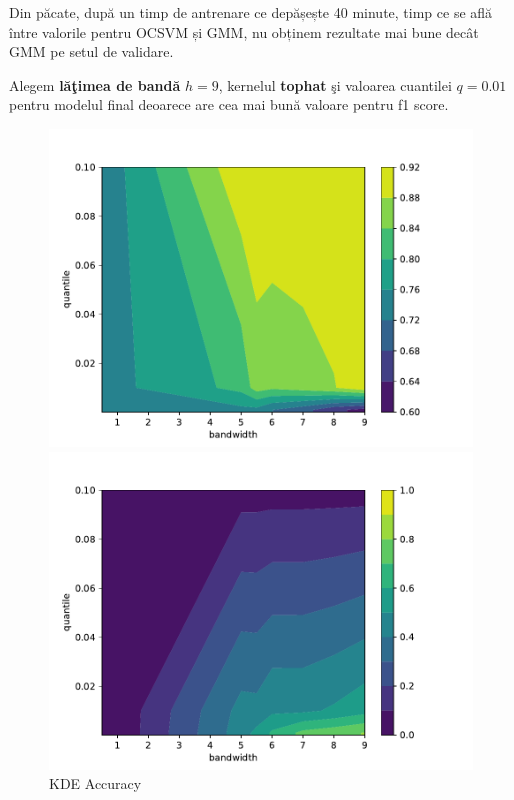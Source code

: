 Din păcate, după un timp de antrenare ce depășește 40 minute, 
timp ce se află între valorile pentru OCSVM și GMM, nu obținem 
rezultate mai bune decât GMM
pe setul de validare. 

Alegem \textbf{lăţimea de bandă} $h=9$, kernelul \textbf{tophat} şi valoarea
cuantilei $q=0.01$ pentru modelul final deoarece are cea
mai bună valoare pentru f1 score.

\begin{figure}[!htb] %
    \begin{minipage}[t]{0.5\textwidth}
        \vspace{0pt}
        \includegraphics[width=\textwidth]{images/kde-accuracy.pdf}
        \caption{KDE Accuracy}
    \end{minipage}
    \hfill
    \begin{minipage}[t]{0.5\textwidth}
        \vspace{0pt}
        \includegraphics[width=\textwidth]{images/kde-precision.pdf}

\end{minipage}
\end{figure}

